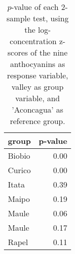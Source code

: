 \begin{table}[ht]
\centering
\begin{tabular}{lr}
  \hline
group & p-value \\ 
  \hline
Biobio & 0.00 \\ 
  Curico & 0.00 \\ 
  Itata & 0.39 \\ 
  Maipo & 0.19 \\ 
  Maule & 0.06 \\ 
  Maule  & 0.17 \\ 
  Rapel & 0.11 \\ 
   \hline
\end{tabular}
\caption{
            $p$-value of each 2-sample test, using the log-concentration 
            z-scores of the nine anthocyanins as response variable, 
            valley as group variable, and 'Aconcagua' 
            as reference group.
        } 
\label{tbl:2}
\end{table}
